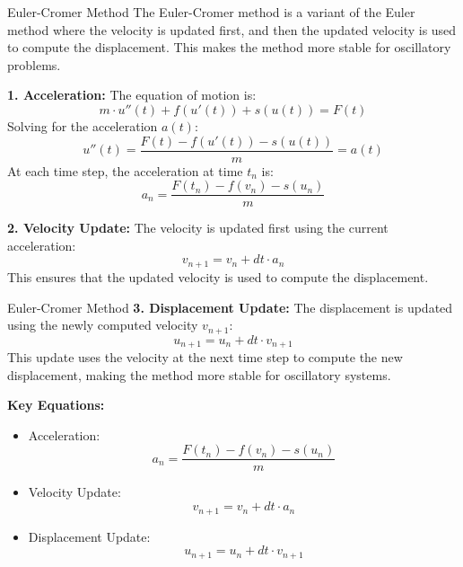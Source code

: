 \documentclass[10pt, aspectratio=54]{beamer}
\begin{document}
\begin{frame}[fragile]{Euler-Cromer Method}
	\justifying
	The Euler-Cromer method is a variant of the Euler method where the velocity is updated first, and then the updated velocity is used to compute the displacement. This makes the method more stable for oscillatory problems.
	
	\textbf{1. Acceleration:}
	The equation of motion is:
	\[
	m \cdot u''(t) + f(u'(t)) + s(u(t)) = F(t)
	\]
	Solving for the acceleration \( a(t) \):
	\[
	u''(t) = \frac{F(t) - f(u'(t)) - s(u(t))}{m} = a(t)
	\]
	At each time step, the acceleration at time \( t_n \) is:
	\[
	a_n = \frac{F(t_n) - f(v_n) - s(u_n)}{m}
	\]
	
	\textbf{2. Velocity Update:}
	The velocity is updated first using the current acceleration:
	\[
	v_{n+1} = v_n + dt \cdot a_n
	\]
	This ensures that the updated velocity is used to compute the displacement.
\end{frame}

\begin{frame}[fragile]{Euler-Cromer Method}
	\justifying
	\textbf{3. Displacement Update:}
	The displacement is updated using the newly computed velocity \( v_{n+1} \):
	\[
	u_{n+1} = u_n + dt \cdot v_{n+1}
	\]
	This update uses the velocity at the next time step to compute the new displacement, making the method more stable for oscillatory systems.
	
	\textbf{Key Equations:}
	\begin{itemize}
		\item Acceleration:
		\[
		a_n = \frac{F(t_n) - f(v_n) - s(u_n)}{m}
		\]
		\item Velocity Update:
		\[
		v_{n+1} = v_n + dt \cdot a_n
		\]
		\item Displacement Update:
		\[
		u_{n+1} = u_n + dt \cdot v_{n+1}
		\]
	\end{itemize}
\end{frame}
\end{document}
